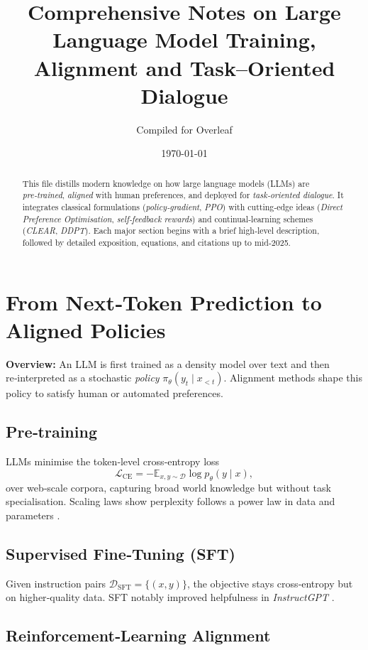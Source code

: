 \documentclass[11pt]{article}
\title{Comprehensive Notes on Large Language Model Training, Alignment and Task--Oriented Dialogue}
\author{Compiled for Overleaf}
\date{\today}
\begin{document}
\maketitle
\begin{abstract}
This file distills modern knowledge on how large language models (LLMs) are \textit{pre‑trained}, \textit{aligned} with human preferences, and deployed for \textit{task‑oriented dialogue}.  It integrates classical formulations (\emph{policy‑gradient}, \emph{PPO}) with cutting‑edge ideas (\emph{Direct Preference Optimisation}, \emph{self‑feedback rewards}) and continual‑learning schemes (\emph{CLEAR}, \emph{DDPT}).  Each major section begins with a brief high‑level description, followed by detailed exposition, equations, and citations up to mid‑2025.
\end{abstract}

\section{From Next‑Token Prediction to Aligned Policies}
\textbf{Overview:}  An LLM is first trained as a density model over text and then re‑interpreted as a stochastic \emph{policy} \(\pi_\theta(y_t \mid x_{<t})\).  Alignment methods shape this policy to satisfy human or automated preferences.

\subsection{Pre‑training}
LLMs minimise the token‑level cross‑entropy loss
\[
  \mathcal{L}_{\text{CE}} = -\mathbb{E}_{x,y\sim \mathcal{D}} \log p_\theta (y \mid x),
\]
over web‑scale corpora, capturing broad world knowledge but without task specialisation.  Scaling laws show perplexity follows a power law in data and parameters \citep{brown2020language}.

\subsection{Supervised Fine‑Tuning (SFT)}
Given instruction pairs \(\mathcal{D}_{\text{SFT}} = \{(x,y)\}\), the objective stays cross‑entropy but on higher‑quality data.  SFT notably improved helpfulness in \emph{InstructGPT} \citep{ouyang2022instructgpt}.

\subsection{Reinforcement‑Learning Alignment}
\end{document}
